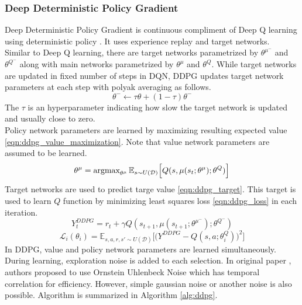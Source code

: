 \subsubsection{Deep Deterministic Policy Gradient}
Deep Deterministic Policy Gradient is continuous compliment of Deep Q learning using deterministic policy \cite{lillicrap_continuous_2019}. It uses experience replay and target networks. \\
Similar to Deep Q learning, there are target networks parametrized by $\theta^{\mu^-}$ and $\theta^{Q^-}$ along with main networks parametrized by $\theta^{\mu}$ and $\theta^{Q}$. While target networks are updated in fixed number of steps in DQN, DDPG updates target network parameters at each step with polyak averaging as follows. \\
\begin{equation}
\label{eqn:target_update}
\theta^- \leftarrow \tau \theta + (1-\tau) \theta^-
\end{equation}
The $\tau$ is an hyperparameter indicating how slow the target network is updated and usually close to zero. \\
Policy network parameters are learned by maximizing resulting expected value \eqref{eqn:ddpg_value_maximization}. Note that value network parameters are assumed to be learned. \\
\begin{equation}
\label{eqn:ddpg_value_maximization}
\theta^\mu = \operatorname{\textup{argmax}}_{\theta^\mu} \mathbb{E}_{s \sim U(\mathcal{D})} \Big[ Q(s, \mu(s_t;\theta^\mu);\theta^Q) \Big]
\end{equation}
Target networks are used to predict targe value \eqref{eqn:ddpg_target}. This target is used to learn $Q$ function by minimizing least squares loss \eqref{eqn:ddpg_loss} in each iteration. \\
\begin{equation}
\label{eqn:ddpg_target}
Y_t^{DDPG} = r_t + \gamma Q(s_{t+1}, \mu(s_{t+1};\theta^{\mu^-});\theta^{Q^-})
\end{equation}
\begin{equation}
\label{eqn:ddpg_loss}
\mathcal{L}_i(\theta_i) = \mathbb{E}_{s,a,r,s'\sim U(\mathcal{D})}\Big[\big( Y^{DDPG} - Q(s,a;\theta^Q_i) \big) ^ 2 \Big]
\end{equation}
In DDPG, value and policy network parameters are learned simultaneously. During learning, exploration noise is added to each selection. In original paper \cite{lillicrap_continuous_2019}, authors proposed to use Ornstein Uhlenbeck Noise \cite{uhlenbeck_theory_1930} which has temporal correlation for efficiency. However, simple gaussian noise or another noise is also possible. Algorithm is summarized in Algorithm \ref{alg:ddpg}. \\
